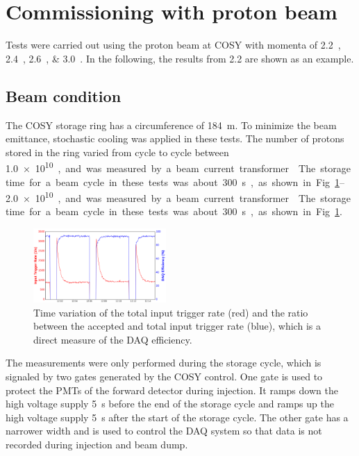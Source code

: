 \documentclass[number,5p]{elsarticle}
\begin{document}
\section{Commissioning with proton beam}
\label{sec:result}

Tests were carried out using the proton beam at COSY with momenta of
\SIlist[list-units=single]{2.2;2.4;2.6;3.0}{\momentum}.
In the following, the results from \SI{2.2}{\momentum} are shown as an example.

\subsection{Beam condition}
\label{sec:beam}
The COSY storage ring has a circumference of \SI{184}{\meter}.
To minimize the beam emittance, stochastic cooling \cite{cooling} was applied in
these tests.
The number of protons stored in the ring varied from cycle to cycle between
\SIrange{1.0e10}{2.0e10}, and was measured by a beam current transformer \cite{bct}.
The storage time for a beam cycle in these tests was about \SI{300}{\second}, as shown in Fig. \ref{fig:beam}.
\begin{figure}[h]
  \centering
  \includegraphics[width=0.45\textwidth]{./daq_efficiency.png}
  \caption{Time variation of the total input trigger rate (red) and the ratio between the accepted and total input trigger rate (blue), which is a direct measure of the DAQ efficiency.}
  \label{fig:beam}
\end{figure}

The measurements were only performed during the storage cycle, which is signaled by two
gates generated by the COSY control.
One gate is used to protect the PMTs of the forward detector during injection.
It ramps down the high voltage supply \SI{5}{\second} before the end of the
storage cycle and ramps up the high voltage supply \SI{5}{\second} after the start of the storage cycle.
The other gate has a narrower width and is used to control the DAQ system so
that data is not recorded during injection and beam dump.
\end{document}
